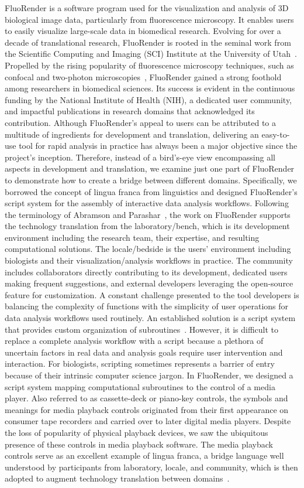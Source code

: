 \documentclass{IEEEcsmag}
\begin{document}
FluoRender is a software program used for the visualization and analysis of 3D biological image data, particularly from fluorescence microscopy. It enables users to easily visualize large-scale data in biomedical research. Evolving for over a decade of translational research, FluoRender is rooted in the seminal work from the Scientific Computing and Imaging (SCI) Institute at the University of Utah~\cite{one}. Propelled by the rising popularity of fluorescence microscopy techniques, such as confocal and two-photon microscopies~\cite{two}, FluoRender gained a strong foothold among researchers in biomedical sciences. Its success is evident in the continuous funding by the National Institute of Health (NIH), a dedicated user community, and impactful publications in research domains that acknowledged its contribution. Although FluoRender’s appeal to users can be attributed to a multitude of ingredients for development and translation, delivering an easy-to-use tool for rapid analysis in practice has always been a major objective since the project’s inception. Therefore, instead of a bird’s-eye view encompassing all aspects in development and translation, we examine just one part of FluoRender to demonstrate how to create a bridge between different domains. Specifically, we borrowed the concept of lingua franca from linguistics and designed FluoRender’s script system for the assembly of interactive data analysis workflows.
Following the terminology of Abramson and Parashar~\cite{three}, the work on FluoRender supports the technology translation from the laboratory/bench, which is its development environment including the research team, their expertise, and resulting computational solutions. The locale/bedside is the users’ environment including biologists and their visualization/analysis workflows in practice. The community includes collaborators directly contributing to its development, dedicated users making frequent suggestions, and external developers leveraging the open-source feature for customization. A constant challenge presented to the tool developers is balancing the complexity of functions with the simplicity of user operations for data analysis workflows used routinely. An established solution is a script system that provides custom organization of subroutines~\cite{four}. However, it is difficult to replace a complete analysis workflow with a script because a plethora of uncertain factors in real data and analysis goals require user intervention and interaction. For biologists, scripting sometimes represents a barrier of entry because of their intrinsic computer science jargon. In FluoRender, we designed a script system mapping computational subroutines to the control of a media player. Also referred to as cassette-deck or piano-key controls, the symbols and meanings for media playback controls originated from their first appearance on consumer tape recorders and carried over to later digital media players. Despite the loss of popularity of physical playback devices, we saw the ubiquitous presence of these controls in media playback software. The media playback controls serve as an excellent example of lingua franca, a bridge language well understood by participants from laboratory, locale, and community, which is then adopted to augment technology translation between domains~\cite{five}.
\end{document}
